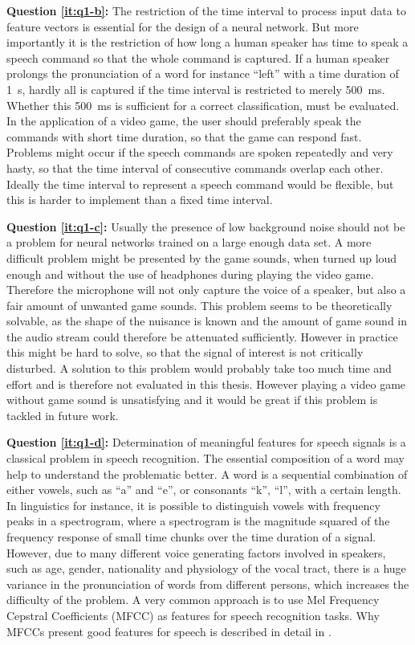 \textbf{Question \ref{it:q1-b}:} 
The restriction of the time interval to process input data to feature vectors is essential for the design of a neural network.
But more importantly it is the restriction of how long a human speaker has time to speak a speech command so that the whole command is captured. 
If a human speaker prolongs the pronunciation of a word for instance \enquote{left} with a time duration of \SI{1}{\second}, hardly all is captured if the time interval is restricted to merely \SI{500}{\milli\second}.
Whether this \SI{500}{\milli\second} is sufficient for a correct classification, must be evaluated.
In the application of a video game, the user should preferably speak the commands with short time duration, so that the game can respond fast.
Problems might occur if the speech commands are spoken repeatedly and very hasty, so that the time interval of consecutive commands overlap each other.
Ideally the time interval to represent a speech command would be flexible, but this is harder to implement than a fixed time interval.

\textbf{Question \ref{it:q1-c}:}
Usually the presence of low background noise should not be a problem for neural networks trained on a large enough data set. 
A more difficult problem might be presented by the game sounds, when turned up loud enough and without the use of headphones during playing the video game. 
Therefore the microphone will not only capture the voice of a speaker, but also a fair amount of unwanted game sounds. 
This problem seems to be theoretically solvable, as the shape of the nuisance is known and the amount of game sound in the audio stream could therefore be attenuated sufficiently.
However in practice this might be hard to solve, so that the signal of interest is not critically disturbed.
A solution to this problem would probably take too much time and effort and is therefore not evaluated in this thesis. 
However playing a video game without game sound is unsatisfying and it would be great if this problem is tackled in future work.

\textbf{Question \ref{it:q1-d}:} 
Determination of meaningful features for speech signals is a classical problem in speech recognition.
The essential composition of a word may help to understand the problematic better.
A word is a sequential combination of either vowels, such as \enquote{a} and \enquote{e}, or consonants \enquote{k}, \enquote{l}, with a certain length. 
In linguistics for instance, it is possible to distinguish vowels with frequency peaks in a spectrogram, where a spectrogram is the magnitude squared of the frequency response of small time chunks over the time duration of a signal.
However, due to many different voice generating factors involved in speakers, such as age, gender, nationality and physiology of the vocal tract, there is a huge variance in the pronunciation of words from different persons, which increases the difficulty of the problem.
A very common approach is to use Mel Frequency Cepstral Coefficients (MFCC) as features for speech recognition tasks.
Why MFCCs present good features for speech is described in detail in .



